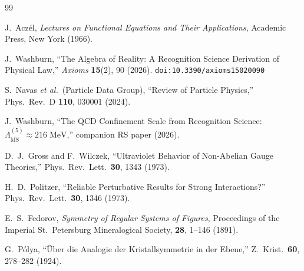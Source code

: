 \documentclass[12pt,a4paper]{article}
\theoremstyle{definition}
\theoremstyle{remark}
\begin{document}
\begin{thebibliography}{99}

J.~Acz\'el, \emph{Lectures on Functional Equations and Their Applications},
Academic Press, New York (1966).

J.~Washburn, ``The Algebra of Reality: A Recognition Science Derivation
of Physical Law,'' \emph{Axioms} \textbf{15}(2), 90 (2026).
\texttt{doi:10.3390/axioms15020090}

S.~Navas \textit{et al.}\ (Particle Data Group),
``Review of Particle Physics,'' Phys.\ Rev.\ D \textbf{110},
030001 (2024).

J.~Washburn, ``The QCD Confinement Scale from Recognition Science:
$\Lambda_{\overline{\mathrm{MS}}}^{(5)} \approx 216\;\mathrm{MeV}$,''
companion RS paper (2026).

D.~J.~Gross and F.~Wilczek, ``Ultraviolet Behavior of
Non-Abelian Gauge Theories,'' Phys.\ Rev.\ Lett.\ \textbf{30},
1343 (1973).

H.~D.~Politzer, ``Reliable Perturbative Results for Strong
Interactions?'' Phys.\ Rev.\ Lett.\ \textbf{30}, 1346 (1973).

E.~S.~Fedorov, \textit{Symmetry of Regular Systems of
Figures}, Proceedings of the Imperial St.~Petersburg
Mineralogical Society, \textbf{28}, 1--146 (1891).

G.~P\'{o}lya, ``\"{U}ber die Analogie der Kristallsymmetrie
in der Ebene,'' Z.~Krist.\ \textbf{60}, 278--282 (1924).

\end{thebibliography}
\end{document}
